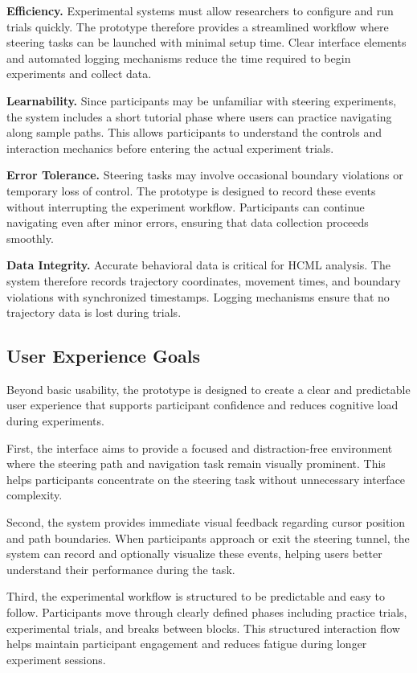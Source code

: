 \documentclass[sigconf]{acmart}
\begin{document}
\textbf{Efficiency.} Experimental systems must allow researchers to configure and run trials quickly. The prototype therefore provides a streamlined workflow where steering tasks can be launched with minimal setup time. Clear interface elements and automated logging mechanisms reduce the time required to begin experiments and collect data.

\textbf{Learnability.} Since participants may be unfamiliar with steering experiments, the system includes a short tutorial phase where users can practice navigating along sample paths. This allows participants to understand the controls and interaction mechanics before entering the actual experiment trials.

\textbf{Error Tolerance.} Steering tasks may involve occasional boundary violations or temporary loss of control. The prototype is designed to record these events without interrupting the experiment workflow. Participants can continue navigating even after minor errors, ensuring that data collection proceeds smoothly.

\textbf{Data Integrity.} Accurate behavioral data is critical for HCML analysis. The system therefore records trajectory coordinates, movement times, and boundary violations with synchronized timestamps. Logging mechanisms ensure that no trajectory data is lost during trials.

\subsection{User Experience Goals}

Beyond basic usability, the prototype is designed to create a clear and predictable user experience that supports participant confidence and reduces cognitive load during experiments.

First, the interface aims to provide a focused and distraction-free environment where the steering path and navigation task remain visually prominent. This helps participants concentrate on the steering task without unnecessary interface complexity.

Second, the system provides immediate visual feedback regarding cursor position and path boundaries. When participants approach or exit the steering tunnel, the system can record and optionally visualize these events, helping users better understand their performance during the task.

Third, the experimental workflow is structured to be predictable and easy to follow. Participants move through clearly defined phases including practice trials, experimental trials, and breaks between blocks. This structured interaction flow helps maintain participant engagement and reduces fatigue during longer experiment sessions.
\end{document}
